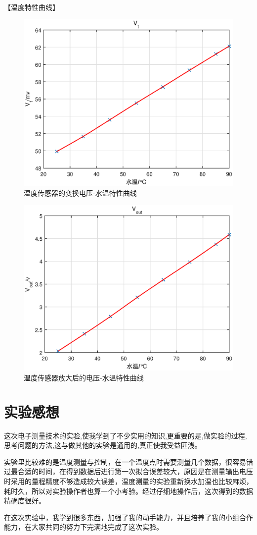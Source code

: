 \documentclass[12pt]{article}
\begin{document}
【温度特性曲线】
\begin{figure}[htbp]
  \centering
  \includegraphics[width=.7\textwidth]{V_T}
  \caption{温度传感器的变换电压-水温特性曲线}\label{V_t}
\end{figure}
\begin{figure}[htbp]
  \centering
  \includegraphics[width=.7\textwidth]{V_OUT}
  \caption{温度传感器放大后的电压-水温特性曲线}\label{V_out}
\end{figure}
\newpage
{}
\section{实验感想}
这次电子测量技术的实验,使我学到了不少实用的知识,更重要的是,做实验的过程,思考问题的方法,这与做其他的实验是通用的,真正使我受益匪浅。\par
实验里比较难的是温度测量与控制，在一个温度点时需要测量几个数据，很容易错过最合适的时间，在得到数据后进行第一次拟合误差较大，原因是在测量输出电压时采用的量程精度不够造成较大误差，温度测量的实验重新换水加温也比较麻烦，耗时久，所以对实验操作者也算一个小考验。经过仔细地操作后，这次得到的数据精确度很好。\par
在这次实验中，我学到很多东西，加强了我的动手能力，并且培养了我的小组合作能力，在大家共同的努力下完满地完成了这次实验。
\end{document}
